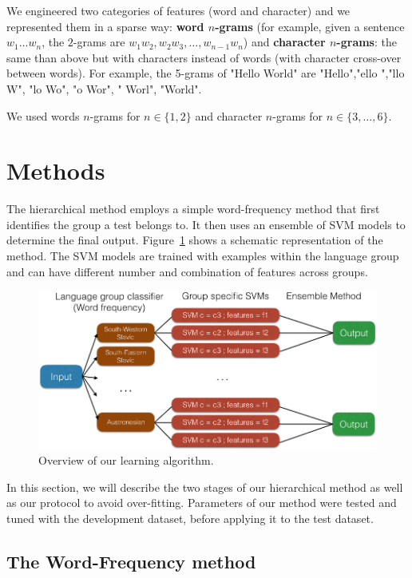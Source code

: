 \documentclass{article}
\begin{document}
We engineered two categories of features (word and character) and we represented them in a sparse way: \textbf{word $n$-grams} (for example, given a sentence $w_1 \ldots w_n$, the $2$-grams are $w_1w_2, w_2w_3, \ldots, w_{n-1}w_n$) and \textbf{character $n$-grams}: the same than above but with characters instead of words (with character cross-over between words). For example, the 5-grams of "Hello World" are "Hello","ello ","llo W", "lo Wo", "o Wor", " Worl", "World". 


We used words $n$-grams for $n\in\{1,2\}$ and character $n$-grams for $n \in \{3, \ldots, 6\}$.

\section{Methods}
The hierarchical method employs a simple word-frequency method that first identifies the group a test belongs to. It then uses an ensemble of SVM models to determine the final output. Figure~\ref{fig:schema} shows a schematic representation of the method. The SVM models are trained with examples within the language group and can have different number and combination of features across groups.

\begin{figure}[h!]
\centering
\includegraphics[scale=0.33]{schema.jpeg}
\caption{Overview of our learning algorithm.}
\label{fig:schema}
\end{figure}

In this section, we will describe the two stages of our hierarchical method as well as our protocol to avoid over-fitting. Parameters of our method were tested and tuned with the development dataset, before applying it to the test dataset. 

\subsection{The Word-Frequency method}
\end{document}
